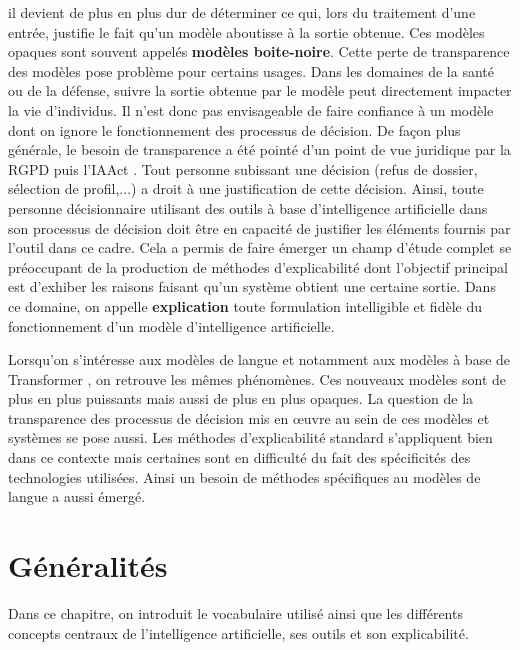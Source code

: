 \documentclass{report}
\newcommand{\alh}[1]{\textcolor{teal}{#1}}
\begin{document}
    il devient de plus en plus dur de déterminer ce qui, lors du traitement d'une entrée, justifie le fait qu'un modèle aboutisse à la sortie obtenue. Ces modèles opaques sont souvent appelés \textbf{modèles boite-noire}. Cette perte de transparence des modèles pose problème pour certains usages. Dans les domaines de la santé ou de la défense, suivre la sortie obtenue par le modèle peut directement impacter la vie d'individus. Il n'est donc pas envisageable de faire confiance à un modèle dont on ignore le fonctionnement des processus de décision. De façon plus générale, le besoin de transparence a été pointé d'un point de vue juridique par la RGPD puis l'IAAct \cite{netter_regards_2019, iaact}. Tout personne subissant une décision (refus de dossier, sélection de profil,...) a droit à une justification de cette décision. Ainsi, toute personne décisionnaire utilisant des outils à base d'intelligence artificielle dans son processus de décision doit être en capacité de justifier les éléments fournis par l'outil dans ce cadre. %
    Cela a permis de faire émerger un champ d'étude complet se préoccupant de la production de méthodes d'explicabilité dont l'objectif principal est d'exhiber les raisons faisant qu'un système obtient une certaine sortie. 
    Dans ce domaine, on appelle \textbf{explication} toute formulation intelligible et fidèle du fonctionnement d'un modèle d'intelligence artificielle. 
    
    Lorsqu'on s'intéresse aux modèles de langue et notamment aux modèles à base de Transformer \cite{vaswani_attention_2017, devlin_bert_2019, radford_improving_2018}, on retrouve les mêmes phénomènes. 
    Ces nouveaux modèles sont de plus en plus puissants mais aussi de plus en plus opaques. La question de la transparence des processus de décision mis en \oe uvre au sein de ces modèles et systèmes se pose aussi. Les méthodes d'explicabilité standard 
    s'appliquent bien dans ce contexte mais certaines sont en difficulté du fait des spécificités des technologies utilisées. Ainsi un besoin de méthodes spécifiques au modèles de langue a aussi émergé.
    


\chapter{Généralités}
    Dans ce chapitre, on introduit le vocabulaire utilisé ainsi que les différents concepts centraux de l'intelligence artificielle, ses outils et son explicabilité.
\end{document}
